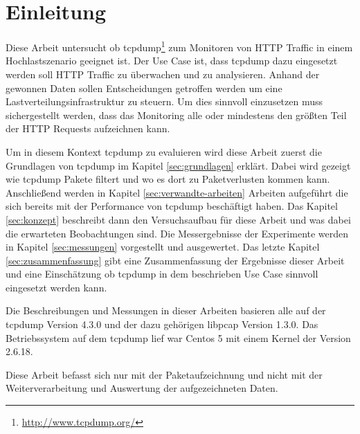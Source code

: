 \section{Einleitung}
\label{sec:einleitung}

Diese Arbeit untersucht ob tcpdump\footnote{\url{http://www.tcpdump.org/}} zum
Monitoren von HTTP Traffic in einem Hochlastszenario geeignet ist. Der Use
Case ist, dass tcpdump dazu eingesetzt werden soll HTTP Traffic zu überwachen
und zu analysieren. Anhand der gewonnen Daten sollen Entscheidungen getroffen
werden um eine Lastverteilungsinfrastruktur zu steuern. Um dies sinnvoll
einzusetzen muss sichergestellt werden, dass das Monitoring alle oder
mindestens den größten Teil der HTTP Requests aufzeichnen kann.

Um in diesem Kontext tcpdump zu evaluieren wird diese Arbeit zuerst die
Grundlagen von tcpdump im Kapitel \ref{sec:grundlagen} erklärt. Dabei wird
gezeigt wie tcpdump Pakete filtert und wo es dort zu Paketverlusten kommen
kann. Anschließend werden in Kapitel \ref{sec:verwandte-arbeiten} Arbeiten
aufgeführt die sich bereits mit der Performance von tcpdump beschäftigt haben.
Das Kapitel \ref{sec:konzept} beschreibt dann den Versuchsaufbau für diese Arbeit
und was dabei die erwarteten Beobachtungen sind. Die Messergebnisse der
Experimente werden in Kapitel \ref{sec:messungen} vorgestellt und ausgewertet.
Das letzte Kapitel \ref{sec:zusammenfassung} gibt eine Zusammenfassung der
Ergebnisse dieser Arbeit und eine Einschätzung ob tcpdump in dem beschrieben
Use Case sinnvoll eingesetzt werden kann.

Die Beschreibungen und Messungen in dieser Arbeiten basieren alle auf der tcpdump
Version 4.3.0 und der dazu gehörigen libpcap Version 1.3.0. Das Betriebssystem
auf dem tcpdump lief war Centos 5 mit einem Kernel der Version 2.6.18.

Diese Arbeit befasst sich nur mit der Paketaufzeichnung und nicht mit der
Weiterverarbeitung und Auswertung der aufgezeichneten Daten.

